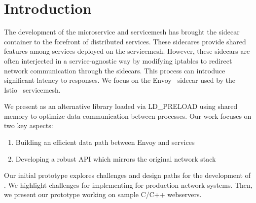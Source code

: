 \section{Introduction}
\label{sec:introduction}
The development of the microservice and servicemesh has brought the sidecar container to the forefront of distributed services.
These sidecares provide shared features among services deployed on the servicemesh.
However, these sidecars are often interjected in a service-agnostic way by modifying iptables to redirect network communication through the sidecars.
This process can introduce significant latency to responses.
We focus on the Envoy~\cite{envoy} sidecar used by the Istio~\cite{istio} servicemesh.

We present \sysname as an alternative library loaded via LD\_PRELOAD using shared memory to optimize data communication between processes.
Our work focuses on two key aspects:
\begin{enumerate}
    \item Building an efficient data path between Envoy and services
    \item Developing a robust API which mirrors the original network stack
\end{enumerate}

Our initial prototype explores challenges and design paths for the development of \sysname.
We highlight challenges for implementing \sysname for production network systems.
Then, we present our prototype working on sample C/C++ webservers.